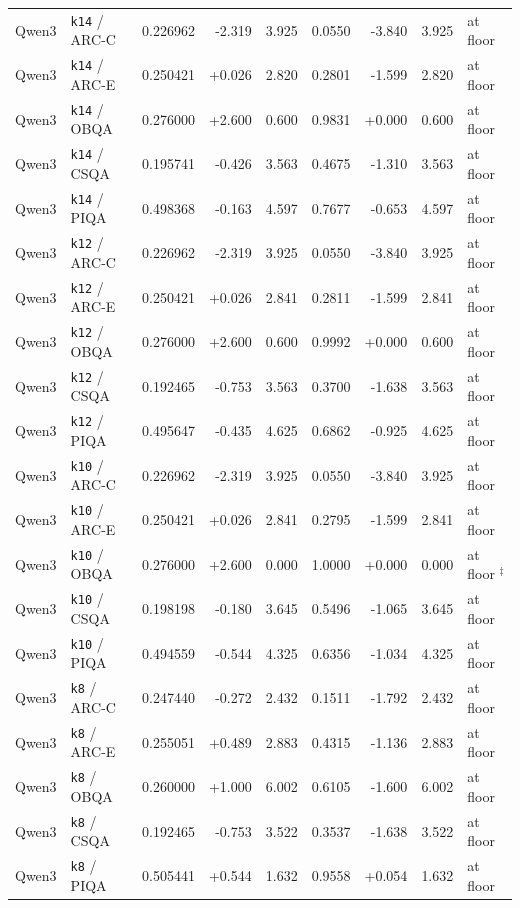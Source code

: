 {\begin{longtable}{@{}llrrrrrrl@{}}
\midrule
Qwen3 & \texttt{k14} / ARC-C & 0.226962 & -2.319 & 3.925 & 0.0550 & -3.840 & 3.925 & at floor \\
Qwen3 & \texttt{k14} / ARC-E & 0.250421 & +0.026 & 2.820 & 0.2801 & -1.599 & 2.820 & at floor \\
Qwen3 & \texttt{k14} / OBQA & 0.276000 & +2.600 & 0.600 & 0.9831 & +0.000 & 0.600 & at floor \\
Qwen3 & \texttt{k14} / CSQA & 0.195741 & -0.426 & 3.563 & 0.4675 & -1.310 & 3.563 & at floor \\
Qwen3 & \texttt{k14} / PIQA & 0.498368 & -0.163 & 4.597 & 0.7677 & -0.653 & 4.597 & at floor \\
\midrule
Qwen3 & \texttt{k12} / ARC-C & 0.226962 & -2.319 & 3.925 & 0.0550 & -3.840 & 3.925 & at floor \\
Qwen3 & \texttt{k12} / ARC-E & 0.250421 & +0.026 & 2.841 & 0.2811 & -1.599 & 2.841 & at floor \\
Qwen3 & \texttt{k12} / OBQA & 0.276000 & +2.600 & 0.600 & 0.9992 & +0.000 & 0.600 & at floor \\
Qwen3 & \texttt{k12} / CSQA & 0.192465 & -0.753 & 3.563 & 0.3700 & -1.638 & 3.563 & at floor \\
Qwen3 & \texttt{k12} / PIQA & 0.495647 & -0.435 & 4.625 & 0.6862 & -0.925 & 4.625 & at floor \\
\midrule
Qwen3 & \texttt{k10} / ARC-C & 0.226962 & -2.319 & 3.925 & 0.0550 & -3.840 & 3.925 & at floor \\
Qwen3 & \texttt{k10} / ARC-E & 0.250421 & +0.026 & 2.841 & 0.2795 & -1.599 & 2.841 & at floor \\
Qwen3 & \texttt{k10} / OBQA & 0.276000 & +2.600 & 0.000 & 1.0000 & +0.000 & 0.000 & at floor $^{\ddagger}$ \\
Qwen3 & \texttt{k10} / CSQA & 0.198198 & -0.180 & 3.645 & 0.5496 & -1.065 & 3.645 & at floor \\
Qwen3 & \texttt{k10} / PIQA & 0.494559 & -0.544 & 4.325 & 0.6356 & -1.034 & 4.325 & at floor \\
\midrule
Qwen3 & \texttt{k8} / ARC-C & 0.247440 & -0.272 & 2.432 & 0.1511 & -1.792 & 2.432 & at floor \\
Qwen3 & \texttt{k8} / ARC-E & 0.255051 & +0.489 & 2.883 & 0.4315 & -1.136 & 2.883 & at floor \\
Qwen3 & \texttt{k8} / OBQA & 0.260000 & +1.000 & 6.002 & 0.6105 & -1.600 & 6.002 & at floor \\
Qwen3 & \texttt{k8} / CSQA & 0.192465 & -0.753 & 3.522 & 0.3537 & -1.638 & 3.522 & at floor \\
Qwen3 & \texttt{k8} / PIQA & 0.505441 & +0.544 & 1.632 & 0.9558 & +0.054 & 1.632 & at floor \\
\end{longtable}
}
